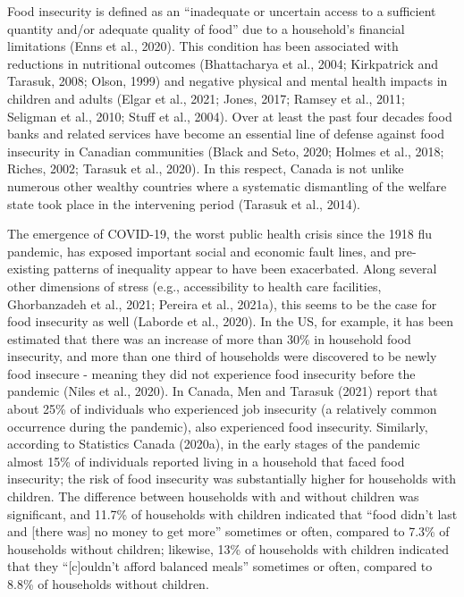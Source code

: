 \documentclass[]{elsarticle} %
\begin{document}
Food insecurity is defined as an ``inadequate or uncertain access to a
sufficient quantity and/or adequate quality of food'' due to a
household's financial limitations (Enns et al., 2020). This condition
has been associated with reductions in nutritional outcomes
(Bhattacharya et al., 2004; Kirkpatrick and Tarasuk, 2008; Olson, 1999)
and negative physical and mental health impacts in children and adults
(Elgar et al., 2021; Jones, 2017; Ramsey et al., 2011; Seligman et al.,
2010; Stuff et al., 2004). Over at least the past four decades food
banks and related services have become an essential line of defense
against food insecurity in Canadian communities (Black and Seto, 2020;
Holmes et al., 2018; Riches, 2002; Tarasuk et al., 2020). In this
respect, Canada is not unlike numerous other wealthy countries where a
systematic dismantling of the welfare state took place in the
intervening period (Tarasuk et al., 2014).

The emergence of COVID-19, the worst public health crisis since the 1918
flu pandemic, has exposed important social and economic fault lines, and
pre-existing patterns of inequality appear to have been exacerbated.
Along several other dimensions of stress (e.g., accessibility to health
care facilities, Ghorbanzadeh et al., 2021; Pereira et al., 2021a), this
seems to be the case for food insecurity as well (Laborde et al., 2020).
In the US, for example, it has been estimated that there was an increase
of more than 30\% in household food insecurity, and more than one third
of households were discovered to be newly food insecure - meaning they
did not experience food insecurity before the pandemic (Niles et al.,
2020). In Canada, Men and Tarasuk (2021) report that about 25\% of
individuals who experienced job insecurity (a relatively common
occurrence during the pandemic), also experienced food insecurity.
Similarly, according to Statistics Canada (2020a), in the early stages
of the pandemic almost 15\% of individuals reported living in a
household that faced food insecurity; the risk of food insecurity was
substantially higher for households with children. The difference
between households with and without children was significant, and 11.7\%
of households with children indicated that ``food didn't last and
{[}there was{]} no money to get more'' sometimes or often, compared to
7.3\% of households without children; likewise, 13\% of households with
children indicated that they ``{[}c{]}ouldn't afford balanced meals''
sometimes or often, compared to 8.8\% of households without children.
\end{document}
